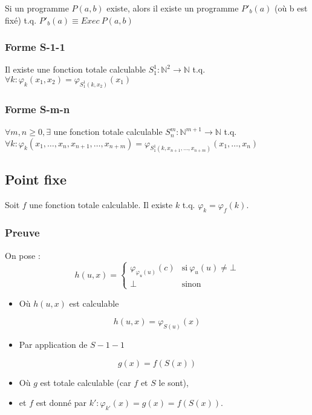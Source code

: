 Si un programme $P(a,b)$ existe, alors il existe un programme $P'_b(a)$ (où b est fixé) t.q. $P'_b(a) \equiv Exec \ P(a,b)$

\subsubsection{Forme S-1-1}

Il existe une fonction totale calculable $S^1_1 : \mathbb{N}^2 \rightarrow \mathbb{N}$ t.q. $\forall k : \varphi_k(x_1, x_2) = \varphi_{S^1_1(k,x_2)}(x_1)$

\subsubsection{Forme S-m-n}

$\forall m,n \geq 0, \exists$ une fonction totale calculable $S^m_n : \mathbb{N}^{m+1} \rightarrow \mathbb{N}$ t.q. $\forall k : \varphi_k(x_1, \ldots, x_n, x_{n+1}, \ldots, x_{n+m}) = \varphi_{S^1_1(k,x_{n+1}, \ldots, x_{n+m})}(x_1, \ldots, x_n)$

\newpage
\subsection{Point fixe}

Soit $f$ une fonction totale calculable. Il existe $k$ t.q. $\varphi_k = \varphi_f(k)$.

\subsubsection{Preuve}

On pose :
\begin{equation}\label{eq:pf1}
h(u,x) =
\begin{cases}
	\varphi_{\varphi_u(u)}(c) & \text{si}\ \varphi_u(u) \neq \bot\\
	\bot & \text{sinon}
\end{cases}
\end{equation}
\begin{itemize}
\item[] Où $h(u,x)$ est calculable
\end{itemize}
\begin{equation}\label{eq:pf2}
h(u,x) = \varphi_{S(u)}(x)
\end{equation}
\begin{itemize}
\item[] Par application de $S-1-1$
\end{itemize}
\begin{equation}\label{eq:pf3}
g(x) = f(S(x))
\end{equation}
\begin{itemize}
\item[] Où $g$ est totale calculable (car $f$ et $S$ le sont),
\item[] et $f$ est donné par $k' : \varphi_{k'}(x) = g(x) = f(S(x))$.
\end{itemize}

